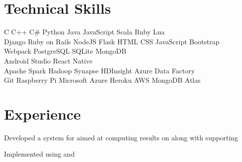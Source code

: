 \documentclass[]{deedy-resume-openfont}
\begin{document}
\section{Technical Skills}
\begin{large}
 C \textbullet{}   C++ \textbullet{}  C\# \textbullet{} Python \textbullet{} Java \textbullet{}
JavaScript \textbullet{} Scala \textbullet{} Ruby \textbullet{} Lua \\

 Django \textbullet{} Ruby on Rails \textbullet{} NodeJS \textbullet{} Flask \textbullet{}
 HTML \textbullet{} CSS \textbullet{} JavaScript \textbullet{} Bootstrap \\ \hspace{36mm} \textbullet{} Webpack \textbullet{} PostgreSQL \textbullet{} SQLite \textbullet{} MongoDB \\

 Android Studio \textbullet{} React Native \\

 Apache Spark \textbullet{} Hadoop  \textbullet{} Synapse \textbullet{} HDInsight \textbullet{} Azure Data Factory \\

 Git \textbullet{} Raspberry Pi \textbullet{} Microsoft Azure \textbullet{} Heroku \textbullet{} AWS \textbullet{} MongoDB Atlas \\

\end{large}
\sectionsep

%
%

\section{Experience}
\begin{large}
\begin{tightemize}
    \item Developed a system for aimed at computing results on along with supporting 
    \item Implemented using and 
\end{tightemize}
\end{large}
\sectionsep
\end{document}
